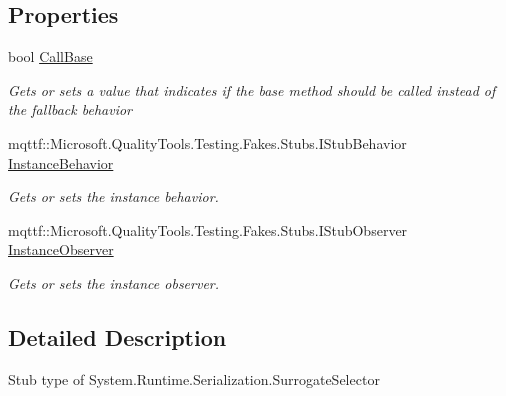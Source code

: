 \subsection*{Properties}
\begin{DoxyCompactItemize}
\item 
bool \hyperlink{class_system_1_1_runtime_1_1_serialization_1_1_fakes_1_1_stub_surrogate_selector_ad0f1d1b9ae3dae0397132ca1de4a0c6e}{Call\-Base}
\begin{DoxyCompactList}\small\item\em Gets or sets a value that indicates if the base method should be called instead of the fallback behavior\end{DoxyCompactList}\item 
mqttf\-::\-Microsoft.\-Quality\-Tools.\-Testing.\-Fakes.\-Stubs.\-I\-Stub\-Behavior \hyperlink{class_system_1_1_runtime_1_1_serialization_1_1_fakes_1_1_stub_surrogate_selector_a7118167ca82f4ee334eac5f08baf6f80}{Instance\-Behavior}
\begin{DoxyCompactList}\small\item\em Gets or sets the instance behavior.\end{DoxyCompactList}\item 
mqttf\-::\-Microsoft.\-Quality\-Tools.\-Testing.\-Fakes.\-Stubs.\-I\-Stub\-Observer \hyperlink{class_system_1_1_runtime_1_1_serialization_1_1_fakes_1_1_stub_surrogate_selector_ad3d1fc8b39523b8192d761001107ee5c}{Instance\-Observer}
\begin{DoxyCompactList}\small\item\em Gets or sets the instance observer.\end{DoxyCompactList}\end{DoxyCompactItemize}


\subsection{Detailed Description}
Stub type of System.\-Runtime.\-Serialization.\-Surrogate\-Selector



